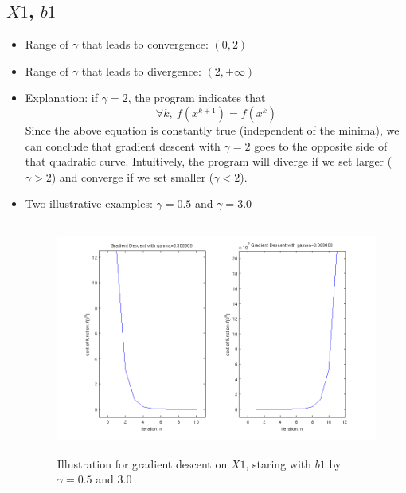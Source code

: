\documentclass[11pt,a4paper]{article}
\begin{document}
\subsection{$X1$, $b1$}
\begin{itemize}
    \item Range of $\gamma$ that leads to convergence: $(0,2)$
    \item Range of $\gamma$ that leads to divergence: $(2,+\infty)$
    \item Explanation: if $\gamma = 2$, the program indicates that 
        $$ \forall k,\ f(x^{k+1}) = f(x^{k})$$ 
        Since the above equation is constantly true (independent of the
        minima), we can conclude that gradient descent with $\gamma = 2$ goes 
        to the opposite side of that quadratic curve. Intuitively, the program 
        will diverge if we set larger ($\gamma>2$) and converge if we set smaller
        ($\gamma<2$).   
    \item Two illustrative examples: $\gamma = 0.5$ and $\gamma = 3.0$
        \begin{figure}[h]
            \centering
            \includegraphics[width=6in,height=3in]{../ps1_matlab/1.png}
            \caption{Illustration for gradient descent on $X1$, staring with
                $b1$ by $\gamma = 0.5$ and $3.0$}
        \end{figure}
\end{itemize}

\newpage
\end{document}
